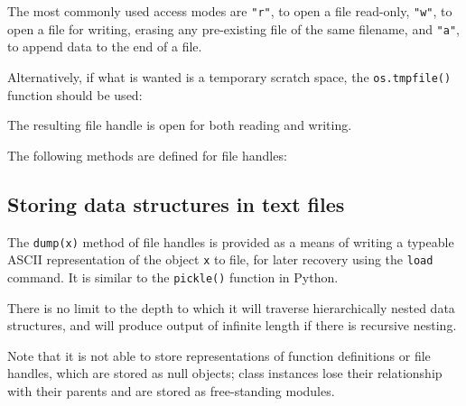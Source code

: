 \vspace{2mm}
\vspace{4mm}

\noindent The most commonly used access modes are {\tt "r"}, to open a file read-only, {\tt "w"}, to open a file for writing, erasing any pre-existing file of the same filename, and {\tt "a"}, to append data to the end of a file.

Alternatively, if what is wanted is a temporary scratch space, the {\tt os.tmpfile()} function should be used:

\vspace{2mm}
\vspace{4mm}

\noindent The resulting file handle is open for both reading and writing.

The following methods are defined for file handles:


\subsection{Storing data structures in text files}

The {\tt dump(x)} method of file handles is provided as a means of writing a
typeable ASCII representation of the object {\tt x} to file, for later recovery
using the {\tt load} command. It is similar to the {\tt pickle()} function in
Python.

There is no limit to the depth to which it will traverse hierarchically nested
data structures, and will produce output of infinite length if there is
recursive nesting.

Note that it is not able to store representations of function definitions or
file handles, which are stored as null objects; class instances lose their
relationship with their parents and are stored as free-standing modules.
